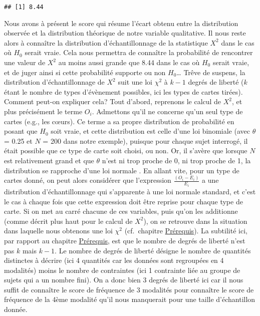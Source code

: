 \documentclass[
]{book}
\begin{document}
\begin{verbatim}
## [1] 8.44
\end{verbatim}

Nous avons à présent le score qui résume l'écart obtenu entre la distribution observée et la distribution théorique de notre variable qualitative. Il nous reste alors à connaître la distribution d'échantillonnage de la statistique \(X^2\) dans le cas où \(H_{0}\) serait vraie. Cela nous permettra de connaître la probabilité de rencontrer une valeur de \(X^2\) au moins aussi grande que 8.44 dans le cas où \(H_{0}\) serait vraie, et de juger ainsi si cette probabilité supporte ou non \(H_{0}\)\ldots{} Trêve de suspens, la distribution d'échantillonnage de \(X^2\) suit une loi \(\chi^2\) à \(k-1\) degrés de liberté (\(k\) étant le nombre de types d'évènement possibles, ici les types de cartes tirées). Comment peut-on expliquer cela? Tout d'abord, reprenons le calcul de \(X^2\), et plus précisément le terme \(O_{i}\). Admettons qu'il ne concerne qu'un seul type de cartes (e.g., les cœurs). Ce terme a sa propre distribution de probabilité en posant que \(H_{0}\) soit vraie, et cette distribution est celle d'une loi binomiale (avec \(\theta\) = 0.25 et \(N\) = 200 dans notre exemple), puisque pour chaque sujet interrogé, il était possible que ce type de carte soit choisi, ou non. Or, il s'avère que lorsque \(N\) est relativement grand et que \(\theta\) n'est ni trop proche de 0, ni trop proche de 1, la distribution se rapproche d'une loi normale \autocite{navarroLearningStatistics2018}. En allant vite, pour un type de cartes donné, on peut alors considérer que l'expression \(\frac{(O_{i} - E_{i})}{E_{i}}\) a une distribution d'échantillonnage qui s'apparente à une loi normale standard, et c'est le cas à chaque fois que cette expression doit être reprise pour chaque type de carte. Si on met au carré chacune de ces variables, puis qu'on les additionne (comme décrit plus haut pour le calcul de \(X^2\)), on se retrouve dans la situation dans laquelle nous obtenons une loi \(\chi^2\) (cf.~chapitre \protect\hyperlink{pruxe9requis-1}{Prérequis}). La subtilité ici, par rapport au chapitre \protect\hyperlink{pruxe9requis-1}{Prérequis}, est que le nombre de degrés de liberté n'est pas \(k\) mais \(k-1\). Le nombre de degrés de liberté désigne le nombre de quantités distinctes à décrire (ici 4 quantités car les données sont regroupées en 4 modalités) moins le nombre de contraintes (ici 1 contrainte liée au groupe de sujets qui a un nombre fini). On a donc bien 3 degrés de liberté ici car il nous suffit de connaître le score de fréquence de 3 modalités pour connaître le score de fréquence de la 4ème modalité qu'il nous manquerait pour une taille d'échantillon donnée.
\end{document}

